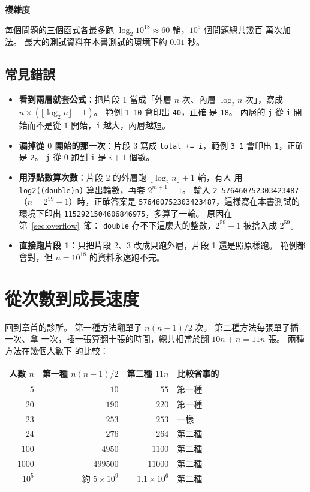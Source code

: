 \textbf{複雜度}

每個問題的三個函式各最多跑 $\log_2 10^{18} \approx 60$ 輪，$10^5$ 個問題總共幾百
萬次加法。 最大的測試資料在本書測試的環境下約 $0.01$ 秒。

\subsection{常見錯誤}

\begin{itemize}
\item \textbf{看到兩層就套公式}：把片段 1 當成「外層 $n$ 次、內層 $\log_2 n$ 次」，寫成
$n \times (\lfloor \log_2 n \rfloor + 1)$。 範例 \texttt{1 10} 會印出 \texttt{40}，正確
是 \texttt{18}。 內層的 \texttt{j} 從 \texttt{i} 開始而不是從 $1$ 開始，\texttt{i}
越大，內層越短。
\item \textbf{漏掉從 $0$ 開始的那一次}：片段 3 寫成 \texttt{total += i}，範例
\texttt{3 1} 會印出 \texttt{1}，正確是 \texttt{2}。 \texttt{j} 從 $0$ 跑到
\texttt{i} 是 $i + 1$ 個數。
\item \textbf{用浮點數算次數}：片段 2 的外層跑 $\lfloor \log_2 n \rfloor + 1$ 輪，有人
用 \texttt{log2((double)n)} 算出輪數，再套 $2^{m+1} - 1$。 輸入 \texttt{2
576460752303423487}（$n = 2^{59} - 1$）時，正確答案是
\texttt{576460752303423487}，這樣寫在本書測試的環境下印出
\texttt{1152921504606846975}，多算了一輪。 原因在第~\ref{sec:overflow}~節：
\texttt{double} 存不下這麼大的整數，$2^{59} - 1$ 被捨入成 $2^{59}$。
\item \textbf{直接跑片段 1}：只把片段 2、3 改成只跑外層，片段 1 還是照原樣跑。 範例都
會對，但 $n = 10^{18}$ 的資料永遠跑不完。
\end{itemize}

\section{從次數到成長速度}
\label{sec:growth}

回到章首的診所。 第一種方法翻單子 $n(n - 1)/2$ 次。 第二種方法每張單子插一次、拿
一次，插一張算翻十張的時間，總共相當於翻 $10n + n = 11n$ 張。 兩種方法在幾個人數下
的比較：

\begin{center}
\begin{tabular}{rrrl}
\toprule
人數 $n$ & 第一種 $n(n-1)/2$ & 第二種 $11n$ & 比較省事的 \\
\midrule
$5$ & $10$ & $55$ & 第一種 \\
$20$ & $190$ & $220$ & 第一種 \\
$23$ & $253$ & $253$ & 一樣 \\
$24$ & $276$ & $264$ & 第二種 \\
$100$ & $4950$ & $1100$ & 第二種 \\
$1000$ & $499500$ & $11000$ & 第二種 \\
$10^5$ & 約 $5 \times 10^9$ & $1.1 \times 10^6$ & 第二種 \\
\bottomrule
\end{tabular}
\end{center}

